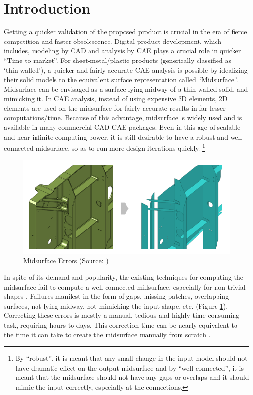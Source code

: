 \section{Introduction}\label{sec:intro}

Getting a quicker validation of the proposed product is crucial in the era of fierce competition and faster obsolescence. Digital product development, which includes, modeling by CAD and analysis by CAE plays a crucial role in quicker ``Time to market''.  For sheet-metal/plastic products (generically classified as `thin-walled'),  a quicker and fairly accurate CAE analysis is possible by idealizing their solid models to the equivalent surface representation called ``Midsurface''. Midsurface can be envisaged as a surface lying midway of a thin-walled solid, and mimicking it.   In CAE analysis, instead of using expensive 3D elements, 2D elements are used on the midsurface for fairly accurate results in far lesser computations/time. Because of this  advantage, midsurface is widely used and is available in many commercial CAD-CAE packages.  Even in this age of scalable and near-infinite computing power, it is still desirable to have  a robust and well-connected midsurface, so as to run more design iterations quickly.  \footnote{By ``robust'', it is meant that any small change in the input model should not have dramatic effect on the output midsurface and by ``well-connected'', it is meant that the midsurface should not have any gaps or overlaps and it should mimic the input correctly, especially at the connections.}

\begin{figure}[!htp]
\centering
\includegraphics[width=0.6\linewidth]{..//Common/images/MidsurfaceErrorsMscApex}
\caption{Midsurface Errors (Source: \cite{MScApex})}
\label{fig:midsurfaceerrors}
\end{figure}

In spite of its demand and popularity, the existing techniques for computing the midsurface fail to compute a well-connected midsurface, especially for non-trivial shapes \cite{ Robinson2006, Stolt2006a,Lockett2008, Woo2013,Automex}. Failures manifest in the form of gaps, missing patches, overlapping surfaces, not lying midway, not mimicking the input shape, etc. (Figure \ref{fig:midsurfaceerrors}). Correcting these errors is mostly a manual, tedious and highly time-consuming task, requiring hours to days. This correction time can be nearly equivalent to the time it can take to create the midsurface manually from scratch \cite{Stolt2006}. 

